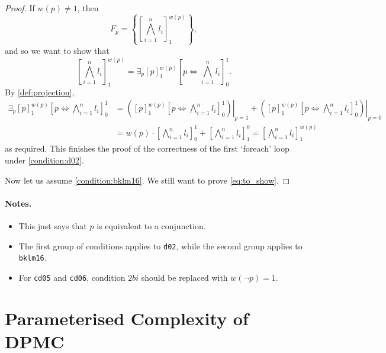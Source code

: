 \documentclass{article}
\theoremstyle{definition}
\theoremstyle{remark}
\begin{document}
\begin{proof}
  If $w(p) \ne 1$, then
  \[
    F_p = \left\{ \left[ \bigwedge_{i = 1}^n l_i \right]_1^{w(p)} \right\},
  \]
  and so we want to show that
  \[
    \left[ \bigwedge_{i = 1}^n l_i \right]_1^{w(p)} = \exists_p [p]_1^{w(p)}
    \left[ p \Leftrightarrow \bigwedge_{i=1}^n l_i \right]_0^1.
  \]
  By \cref{def:projection},
  \begin{align*}
    \exists_p [p]_1^{w(p)} \left[ p \Leftrightarrow \bigwedge_{i=1}^n l_i \right]_0^1 &= \left.\left( [p]_1^{w(p)} \left[ p \Leftrightarrow \bigwedge_{i=1}^n l_i \right]_0^1 \right)\right|_{p=1} + \left.\left([p]_1^{w(p)} \left[ p \Leftrightarrow \bigwedge_{i=1}^n l_i \right]_0^1 \right)\right|_{p=0} \\
                                                                                      &= w(p) \cdot \left[ \bigwedge_{i=1}^n l_i \right]_0^1 + \left[ \bigwedge_{i=1}^n l_i \right]_1^0 = \left[ \bigwedge_{i=1}^n l_i \right]_1^{w(p)}
  \end{align*}
  as required. This finishes the proof of the correctness of the first `foreach'
  loop under \cref{condition:d02}.

  Now let us assume \cref{condition:bklm16}. We still want to prove
  \cref{eq:to_show}.
\end{proof}

\paragraph{Notes.}
\begin{itemize}
\item This just says that $p$ is equivalent to a conjunction.
\item The first group of conditions applies to \texttt{d02}, while the second
  group applies to \texttt{bklm16}.
\item For \texttt{cd05} and \texttt{cd06}, condition $2bi$ should be replaced
  with $w(\neg p) = 1$.
\end{itemize}

\section{Parameterised Complexity of \textsc{DPMC}}
\end{document}
